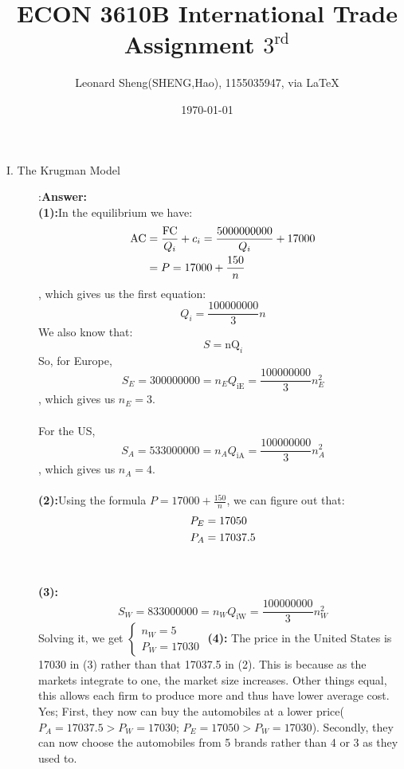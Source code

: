 \documentclass{article}
\begin{document}
\title{ECON 3610B International Trade \\Assignment $3^{\text{rd}}$}
\author{{\normalsize Leonard Sheng(SHENG,Hao), 1155035947, via \LaTeX}}
\date{\today}

\maketitle
\baselineskip 0.6cm

\begin{description}
    \item[I. The Krugman Model]:{\bf Answer:}\\
    {\bf (1):}In the equilibrium we have:
    \begin{align} \notag
      \text{AC}&=\frac{\text{FC}}{Q_i}+c_i=\frac{5000000000}{Q_i}+17000\\ \notag
      &=P=17000+\frac{150}{n}
    \end{align}
    , which gives us the first equation:$$Q_i=\frac{100000000}{3}n$$
    We also know that:$$S=\text{nQ}_i$$
    So, for Europe, $$S_E=300000000=n_EQ_{\text{iE}}=\frac{100000000}{3}n_E^2$$
    , which gives us $n_E=3$.\\\\
    For the US, $$S_A=533000000=n_AQ_{\text{iA}}=\frac{100000000}{3}n_A^2$$
    , which gives us $n_A=4$.\\\\
    {\bf (2):}Using the formula $P=17000+\frac{150}{n}$, we can figure out that:
    \begin{align} \notag
      P_E&=17050\\ \notag
      P_A&=17037.5
    \end{align}\\\\
    {\bf (3):}
    $$S_W=833000000=n_WQ_{\text{iW}}=\frac{100000000}{3}n_W^2$$
    Solving it, we get $\begin{cases}
 n_W=5 \\
 P_W=17030
\end{cases}$\newpage
    {\bf (4):}
    The price in the United States is 17030 in (3) rather than that 17037.5 in (2). This is because as the markets integrate to one, the market size increases. Other things equal, this allows each firm to produce more and thus have lower average cost.\\
    Yes; First, they now can buy the automobiles at a lower price($P_A=17037.5>P_W=17030$; $P_E=17050>P_W=17030$). Secondly, they can now choose the automobiles from 5 brands rather than 4 or 3 as they used to. \newpage

\end{description}
\end{document}
